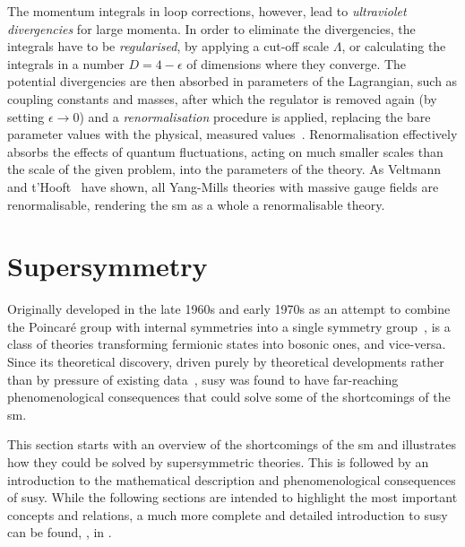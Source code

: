 The momentum integrals in loop corrections, however, lead to \textit{ultraviolet divergencies} for large momenta. In order to eliminate the divergencies, the integrals have to be \textit{regularised}, \eg by applying a cut-off scale $\Lambda$, or calculating the integrals in a number $D = 4-\epsilon$ of dimensions where they converge. The potential divergencies are then absorbed in parameters of the Lagrangian, such as coupling constants and masses, after which the regulator is removed again (\eg by setting $\epsilon\rightarrow 0$) and a \textit{renormalisation} procedure is applied, replacing the bare parameter values with the physical, measured values~\cite{Brock:1354959}. Renormalisation effectively absorbs the effects of quantum fluctuations, acting on much smaller scales than the scale of the given problem, into the parameters of the theory.
 As Veltmann and t'Hooft~\cite{THOOFT1972189,THOOFT1971173} have shown, all Yang-Mills theories with massive gauge fields are renormalisable, rendering the \gls{sm} as a whole a renormalisable theory.  

\section{Supersymmetry}

Originally developed in the late 1960s and early 1970s as an attempt to combine the Poincaré group with internal symmetries into a single symmetry group~\cite{kane2000the},  is a class of theories transforming fermionic states into bosonic ones, and vice-versa. Since its theoretical discovery, driven purely by theoretical developments rather than by pressure of existing data~\cite{kane2000the}, \gls{susy} was found to have far-reaching phenomenological consequences that could solve some of the shortcomings of the \gls{sm}. 

This section starts with an overview of the shortcomings of the \gls{sm} and illustrates how they could be solved by supersymmetric theories. This is followed by an introduction to the mathematical description and phenomenological consequences of \gls{susy}. While the following sections are intended to highlight the most important concepts and relations, a much more complete and detailed introduction to \gls{susy} can be found, \eg, in \cite{Martin:1997ns,Bustamante:2009us}.


